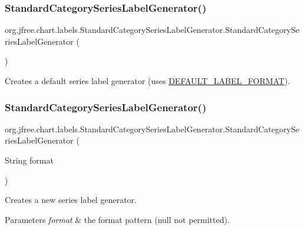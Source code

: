 \subsubsection{\texorpdfstring{Standard\+Category\+Series\+Label\+Generator()}{StandardCategorySeriesLabelGenerator()}\hspace{0.1cm}{\footnotesize\ttfamily [1/2]}}
{\footnotesize\ttfamily org.\+jfree.\+chart.\+labels.\+Standard\+Category\+Series\+Label\+Generator.\+Standard\+Category\+Series\+Label\+Generator (\begin{DoxyParamCaption}{ }\end{DoxyParamCaption})}

Creates a default series label generator (uses \mbox{\hyperlink{classorg_1_1jfree_1_1chart_1_1labels_1_1_standard_category_series_label_generator_a9818040565d02daadc9c132d96df8816}{D\+E\+F\+A\+U\+L\+T\+\_\+\+L\+A\+B\+E\+L\+\_\+\+F\+O\+R\+M\+AT}}). \mbox{\label{classorg_1_1jfree_1_1chart_1_1labels_1_1_standard_category_series_label_generator_a943fb08d5a84a0bca018d4c429f49d27}} 
\subsubsection{\texorpdfstring{Standard\+Category\+Series\+Label\+Generator()}{StandardCategorySeriesLabelGenerator()}\hspace{0.1cm}{\footnotesize\ttfamily [2/2]}}
{\footnotesize\ttfamily org.\+jfree.\+chart.\+labels.\+Standard\+Category\+Series\+Label\+Generator.\+Standard\+Category\+Series\+Label\+Generator (\begin{DoxyParamCaption}\item[{String}]{format }\end{DoxyParamCaption})}

Creates a new series label generator.


\begin{DoxyParams}{Parameters}
{\em format} & the format pattern ({\ttfamily null} not permitted). \\
\hline
\end{DoxyParams}


